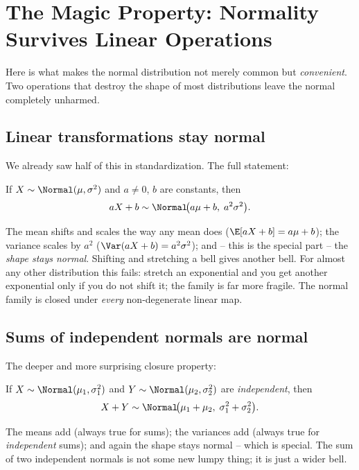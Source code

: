 \section{The Magic Property: Normality Survives Linear Operations}
\label{ch12:closure}

Here is what makes the normal distribution not merely common but \emph{convenient}.
Two operations that destroy the shape of most distributions leave the normal
completely unharmed.

\subsection{Linear transformations stay normal}
\label{ch12:linear}

We already saw half of this in standardization. The full statement:

\begin{theorem}
\label{ch12:thm-linear}
If $X \sim \Normal(\mu, \sigma^2)$ and $a \ne 0$, $b$ are constants, then
\[
  aX + b \sim \Normal\!\big(a\mu + b,\; a^2\sigma^2\big).
\]
\end{theorem}

The mean shifts and scales the way any mean does ($\E[aX+b] = a\mu + b$); the
variance scales by $a^2$ ($\Var(aX+b) = a^2\sigma^2$); and -- this is the special
part -- the \emph{shape stays normal}. Shifting and stretching a bell gives another
bell. For almost any other distribution this fails: stretch an exponential and you
get another exponential only if you do not shift it; the family is far more
fragile. The normal family is closed under \emph{every} non-degenerate linear map.

\subsection{Sums of independent normals are normal}
\label{ch12:sums}

The deeper and more surprising closure property:

\begin{theorem}
\label{ch12:thm-sum}
If $X \sim \Normal(\mu_1, \sigma_1^2)$ and $Y \sim \Normal(\mu_2, \sigma_2^2)$ are
\emph{independent}, then
\[
  X + Y \sim \Normal\!\big(\mu_1 + \mu_2,\; \sigma_1^2 + \sigma_2^2\big).
\]
\end{theorem}

The means add (always true for sums); the variances add (always true for
\emph{independent} sums); and again the shape stays normal -- which is special. The
sum of two independent normals is not some new lumpy thing; it is just a wider
bell.

